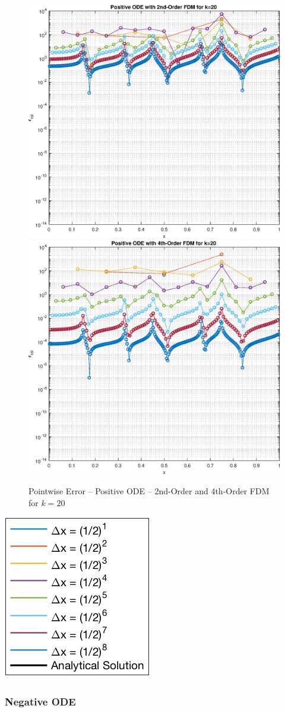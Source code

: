 \documentclass[10pt, reqno]{article}		%
\numberwithin{equation}{section}
\begin{document}
\begin{figure}[H]
\begin{center}
	\includegraphics[width = 0.49\linewidth]{error_positive_ode_order_2_k_20}
	\includegraphics[width = 0.49\linewidth]{error_positive_ode_order_4_k_20}
	\caption{Pointwise Error -- Positive ODE -- 2nd-Order and 4th-Order FDM for $k = 20$}
\end{center}
\end{figure}

\begin{center}
	\includegraphics[height = 0.25\linewidth]{legend}
\end{center}

\newpage

\subsubsection{Negative ODE}
\end{document}
